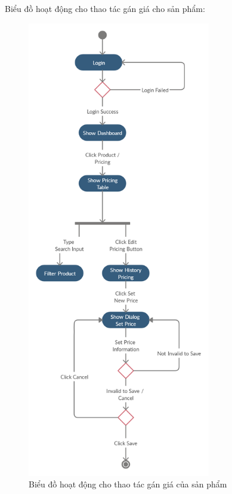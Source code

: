 Biểu đồ hoạt động cho thao tác gán giá cho sản phẩm:
\begin{figure}[H]
\centering
\includegraphics[width=8cm]{images/activity-diagram/set-price.png}
\caption{Biểu đồ hoạt động cho thao tác gán giá của sản phẩm}
\end{figure}

